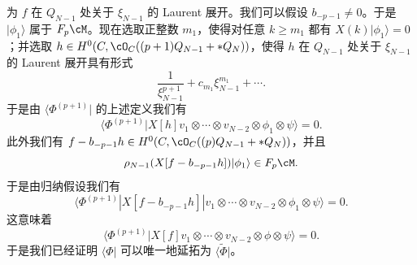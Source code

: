
为 $f$ 在 $Q_{N-1}$ 处关于 $\xi_{N-1}$ 的 Laurent 展开。我们可以假设
$b_{-p-1}\ne0$。于是 $|\phi_1\rangle$ 属于 $F_p\cM$。现在选取正整数
$m_1$，使得对任意 $k\ge m_1$ 都有 $X(k)|\phi_1\rangle=0$；并选取
$h\in H^0(C,\cO_C((p+1)Q_{N-1}+*Q_N))$，使得 $h$ 在 $Q_{N-1}$ 处关于
$\xi_{N-1}$ 的 Laurent 展开具有形式
\[
\frac{1}{\xi_{N-1}^{p+1}}+c_{m_1}\xi_{N-1}^{m_1}+\cdots.
\]
于是由 $\langle\Phi^{(p+1)}|$ 的上述定义我们有
\[
\langle\Phi^{(p+1)}|X[h]v_1\otimes\cdots\otimes v_{N-2}
\otimes\phi_1\otimes\psi\rangle=0.
\]
此外我们有 $f-b_{-p-1}h\in H^0(C,\cO_C((p)Q_{N-1}+*Q_N))$，并且
\[
\rho_{N-1}(X[f-b_{-p-1}h])|\phi_1\rangle\in F_p\cM.
\]
于是由归纳假设我们有
\[
\langle\Phi^{(p+1)}|X[f-b_{-p-1}h]|v_1\otimes\cdots\otimes v_{N-2}
\otimes\phi_1\otimes\psi\rangle=0.
\]
这意味着
\[
\langle\Phi^{(p+1)}|X[f]v_1\otimes\cdots\otimes v_{N-2}
\otimes\phi\otimes\psi\rangle=0.
\]
于是我们已经证明 $\langle\Phi|$ 可以唯一地延拓为 $\langle\tilde\Phi|$。

